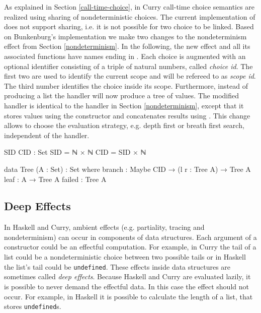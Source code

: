 As explained in Section \ref{call-time-choice}, in Curry call-time choice
semantics are realized using sharing of nondeterministic choices.
The current implementation of  does not support sharing,
i.e. it is not possible for two choice to be linked.
Based on Bunkenburg's implementation we make two changes to the
nondeterminism effect from Section \ref{nondeterminism}.
In the following, the new effect and all its associated functions have names
ending in .
Each choice is augmented with an optional identifier consisting of a triple of
natural numbers, called \textit{choice id}.
The first two are used to identify the current scope and will be refereed to as
\textit{scope id}.
The third number identifies the choice inside its scope.
Furthermore, instead of producing a list the handler will now produce a tree of
values.
The modified handler is identical to the handler in Section
\ref{nondeterminism}, except that it stores values using the
 constructor and concatenates results using
.
This change allows to choose the evaluation strategy, e.g. depth first or breath
first search, independent of the handler.

\begin{code}
SID CID : Set
SID = ℕ × ℕ
CID = SID × ℕ

data Tree (A : Set) : Set where
  branch  : Maybe CID → (l r : Tree A) → Tree A
  leaf    : A → Tree A
  failed  : Tree A
\end{code}

\subsection{Deep Effects}
\label{first-order:deep-effects}

In Haskell and Curry, ambient effects (e.g. partiality, tracing and
nondeterminism) can occur in components of data structures.
Each argument of a constructor could be an effectful computation.
For example, in Curry the tail of a list could be a nondeterministic choice
between two possible tails or in Haskell the list's tail could be
\texttt{undefined}.
These effects inside data structures are sometimes called \textit{deep effects}.
Because Haskell and Curry are evaluated lazily, it is possible to never demand
the effectful data.
In this case the effect should not occur.
For example, in Haskell it is possible to calculate the length of a list, that
stores \texttt{undefined}s.

